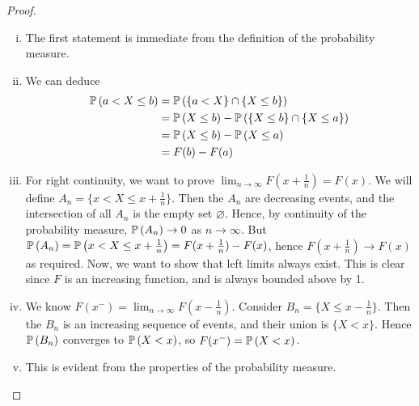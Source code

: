 \documentclass{article}
\begin{document}
\begin{proof}
	\begin{enumerate}[(i)]
		\item The first statement is immediate from the definition of the probability measure.
		\item We can deduce
		      \begin{align*}
			      \mathbb{P}\left({a < X \leq b}\right) & = \mathbb{P}\left({\{ a < X \} \cap \{ X \leq b \}}\right)                  \\
			                          & = \mathbb{P}\left({X \leq b}\right) - \mathbb{P}\left({\{X \leq b\} \cap \{X \leq a\}}\right) \\
			                          & = \mathbb{P}\left({X \leq b}\right) - \mathbb{P}\left({X \leq a}\right)                       \\
			                          & = F(b) - F(a)
		      \end{align*}
		\item For right continuity, we want to prove $\lim_{n \to \infty} F(x + \frac{1}{n}) = F(x)$. We will define $A_n = \{ x < X \leq x + \frac{1}{n} \}$. Then the $A_n$ are decreasing events, and the intersection of all $A_n$ is the empty set $\varnothing$. Hence, by continuity of the probability measure, $\mathbb{P}\left({A_n}\right) \to 0$ as $n \to \infty$. But $\mathbb{P}\left({A_n}\right) = \mathbb{P}\left({x < X \leq x + \frac{1}{n}}\right) = F(x + \frac{1}{n}) - F(x)$, hence $F(x + \frac{1}{n}) \to F(x)$ as required. Now, we want to show that left limits always exist. This is clear since $F$ is an increasing function, and is always bounded above by 1.
		\item We know $F(x^-) = \lim_{n \to \infty}F(x - \frac{1}{n})$. Consider $B_n = \{ X \leq x - \frac{1}{n} \}$. Then the $B_n$ is an increasing sequence of events, and their union is $\{ X < x \}$. Hence $\mathbb{P}\left({B_n}\right)$ converges to $\mathbb{P}\left({X < x}\right)$, so $F(x^-) = \mathbb{P}\left({X < x}\right)$.
		\item This is evident from the properties of the probability measure.
	\end{enumerate}
\end{proof}
\end{document}
